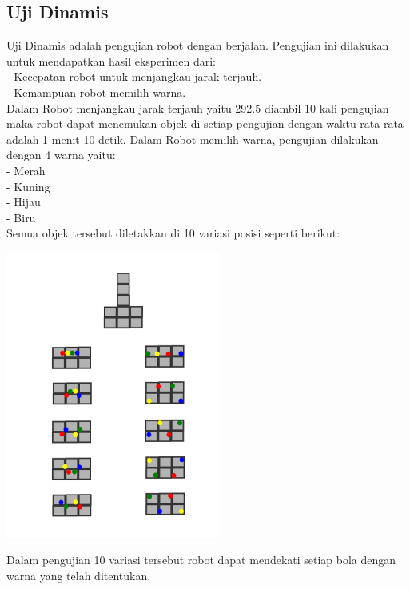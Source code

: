 \documentclass[10pt,journal,compsoc]{IEEEtran}
\begin{document}
  \subsection{Uji Dinamis}
  Uji Dinamis adalah pengujian robot dengan berjalan.
  Pengujian ini dilakukan untuk mendapatkan hasil eksperimen dari:\\
  - Kecepatan robot untuk menjangkau jarak terjauh.\\
  - Kemampuan robot memilih warna.\\
  Dalam Robot menjangkau jarak terjauh yaitu 292.5 diambil 10 kali pengujian maka robot dapat menemukan objek di setiap pengujian dengan waktu rata-rata adalah 1 menit 10 detik.
  Dalam Robot memilih warna, pengujian dilakukan dengan 4 warna yaitu:\\
  - Merah\\
  - Kuning\\
  - Hijau\\
  - Biru\\
  Semua objek tersebut diletakkan di 10 variasi posisi seperti berikut:
  \begin{center}
    \includegraphics[width=200pt]{uji_warna}
  \end{center}
  Dalam pengujian 10 variasi tersebut robot dapat mendekati setiap bola dengan warna yang telah ditentukan.
  
\end{document}
